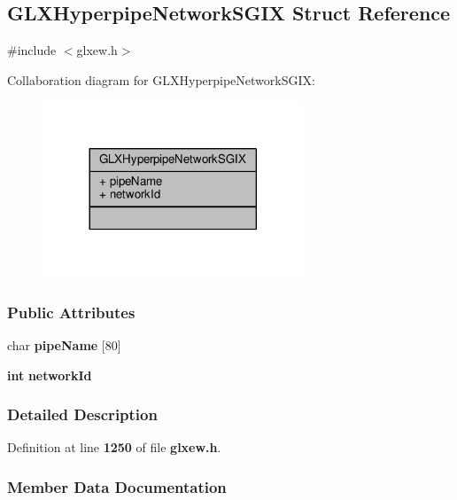 \subsection{G\+L\+X\+Hyperpipe\+Network\+S\+G\+IX Struct Reference}
\label{structGLXHyperpipeNetworkSGIX}


{\ttfamily \#include $<$glxew.\+h$>$}



Collaboration diagram for G\+L\+X\+Hyperpipe\+Network\+S\+G\+IX\+:
\nopagebreak
\begin{figure}[H]
\begin{center}
\leavevmode
\includegraphics[width=221pt]{dd/dd3/structGLXHyperpipeNetworkSGIX__coll__graph}
\end{center}
\end{figure}
\subsubsection*{Public Attributes}
\begin{DoxyCompactItemize}
\item 
char {\bf pipe\+Name} [80]
\item 
{\bf int} {\bf network\+Id}
\end{DoxyCompactItemize}


\subsubsection{Detailed Description}


Definition at line {\bf 1250} of file {\bf glxew.\+h}.



\subsubsection{Member Data Documentation}
